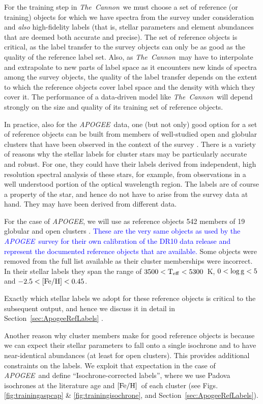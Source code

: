 \documentclass[12pt, preprint]{aastex}
\newcommand{\sectionname}{Section}
\newcommand{\tc}{\textsl{The~Cannon}}
\newcommand{\apogee}{\textsl{APOGEE}}
\newcommand{\teff}{\mbox{$\rm T_{eff}$}}
\newcommand{\feh}{\mbox{$\rm [Fe/H]$}}
\newcommand{\logg}{\mbox{$\rm \log g$}}
\begin{document}
For the training step in \tc\ we must choose a set of reference (or training) objects for which we have spectra from the survey under consideration and \emph{also} high-fidelity labels (that is, stellar parameters and element abundances that are deemed both accurate and precise).
The set of reference objects is critical, as the label transfer to the survey objects can only be as good as the quality of the reference label set. 
Also, as \tc\ may have to interpolate and extrapolate to new parts of label space as
it encounters new kinds of spectra among the survey objects, the quality
of the label transfer depends on the extent to which the reference objects
cover label space and the density with which they cover it.
The performance of a data-driven model like \tc\ will depend strongly on the size and quality of its training set of reference objects.

In practice, also for the \apogee\ data, one (but not only) good option
for a set of reference objects can be built from 
members of well-studied open and globular clusters that have been observed in the context of the survey \citep{Zaso2013, Meszaros2013}.
There is a variety of reasons why the stellar labels for cluster stars may be particularly accurate and robust.
For one, they could have their labels derived from independent, high resolution spectral analysis of these
stars, for example, from observations in a well understood portion of the optical wavelength region. The
labels are of course a property of the
star, and hence do not have to arise from the survey data at hand. They may have been derived from different data.

For the case of \apogee, we will use as reference objects 542 members of 19 globular and open clusters \citep{Meszaros2013}. \textcolor{blue}{These are the very same objects as used by the \apogee\ survey for their own calibration of the DR10 data release and represent the documented reference objects that are available. }Some objects were removed from the full list available as their cluster memberships were incorrect. In their stellar labels they span the range of $3500<\teff<5300$~K, $0<\logg<5$ and $-2.5<\feh<0.45$. 

Exactly which stellar labels we adopt for these reference objects is critical to the subsequent output, and hence 
we discuss it in detail in \sectionname~\ref{sec:ApogeeRefLabels} .

Another reason why cluster members make for good reference objects is because we can expect their stellar parameters to fall onto a single isochrone and to have near-identical abundances (at least for open clusters). This provides additional constraints on the labels.
We exploit that expectation in the case of \apogee\ and define ``Isochrone-corrected labels'', where we use Padova isochrones at the literature age and \feh\ of each cluster (see Figs. \ref{fig:trainingaspcap} \& \ref{fig:trainingisochrone}, and \sectionname~\ref{sec:ApogeeRefLabels}).
\end{document}
